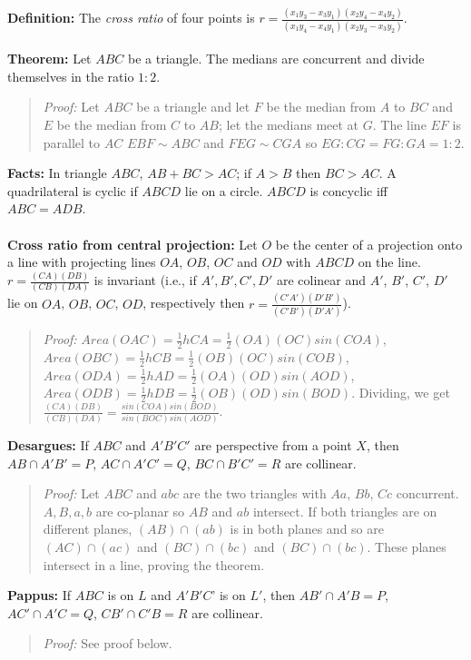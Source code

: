 {\bf Definition:}
The \emph{cross ratio} of four points is
$r= {\frac {(x_{1}y_{3}-x_{3}y_{1}) (x_{2}y_{4}-x_{4}y_{2})}
{ (x_{1}y_{4}-x_{4}y_{1}) (x_{2}y_{3}-x_{3}y_{2})}}$.
\\
\\
{\bf Theorem:}  Let $ABC$ be a triangle.  The medians are concurrent and divide themselves in
the ratio $1:2$.
\begin{quote}
\emph{Proof:} Let $ABC$ be a triangle and let $F$ be the median from $A$ to $BC$ and
$E$ be the median from $C$ to $AB$; let the medians meet at $G$.
The line $EF$ is parallel to $AC$ $EBF \sim ABC$ and $FEG \sim CGA$ so
$EG:CG = FG : GA = 1:2$.
\end{quote}
{\bf Facts:}
In triangle $ABC$, $AB + BC > AC$; if $A > B$ then $BC > AC$.  A quadrilateral
is cyclic if $ABCD$ lie on a circle. $ABCD$ is concyclic iff $ABC=ADB$.
\\
\\
{\bf Cross ratio from central projection:} Let $O$ be the center 
of a projection onto
a line with projecting lines $OA$, $OB$, $OC$ and $OD$ with $ABCD$ on the line. $r=
{\frac {(CA)(DB)} {(CB)(DA)}}$ is invariant (i.e., if $A', B', C', D'$ are colinear and
$A'$, $B'$, $C'$, $D'$ lie on $OA$, $OB$, $OC$, $OD$, respectively then
$r= {\frac {(C'A')(D'B')} {(C'B')(D'A')}}$).
\begin{quote}
\emph{Proof:} 
$Area(OAC) = {\frac {1} {2}} h CA = {\frac 1 2} (OA)(OC)sin(COA)$,
$Area(OBC) = {\frac {1} {2}} h CB = {\frac 1 2} (OB)(OC)sin(COB)$,
$Area(ODA) = {\frac {1} {2}} h AD = {\frac 1 2} (OA)(OD)sin(AOD)$,
$Area(ODB) = {\frac {1} {2}} h DB = {\frac 1 2} (OB)(OD)sin(BOD)$.
Dividing, we get
${\frac {(CA)(DB)} {(CB)(DA)}} = {\frac {sin(COA) sin(BOD)} {sin(BOC) sin(AOD)}}$.
\end{quote}
{\bf Desargues:} If $ABC$ and $A'B'C'$ are perspective from a point $X$, then
$AB \cap A'B' = P$, $AC \cap A'C' = Q$, $BC \cap B'C' = R$
are collinear.
\begin{quote}
\emph{Proof:}
Let $ABC$ and $abc$ are the two triangles with $Aa$, $Bb$, $Cc$ concurrent.
$A, B, a, b$ are co-planar so $AB$ and $ab$ intersect.  If both triangles
are on different planes, $(AB) \cap (ab)$ is in both planes and so are
$(AC) \cap (ac)$ and $(BC) \cap (bc)$  and $(BC) \cap (bc)$.  These planes
intersect in a line, proving the theorem.
\end{quote}
{\bf Pappus:} If $ABC$ is on $L$ and $A'B'C$' is on $L'$, then
$AB' \cap A'B = P$, $AC' \cap A'C = Q$, $CB' \cap C'B = R$ are collinear. 
\begin{quote}
\emph{Proof:} See proof below.
\end{quote}

